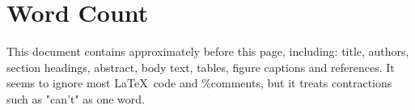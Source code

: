 

\newpage





\newpage

\section*{Word Count}

This document contains approximately {\large \textbf{\wordcount}} before this page, including: title, authors, section headings, abstract, body text, tables, figure captions and references. It seems to ignore most \LaTeX \ code and \%comments, but it treats contractions such as "can't" as one word.



